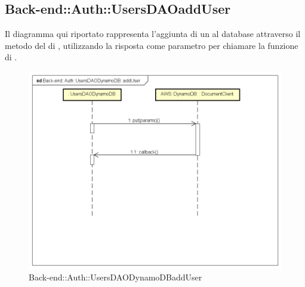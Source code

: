 \subsection{Back-end::Auth::UsersDAOaddUser}
Il diagramma qui riportato rappresenta l'aggiunta di un  al database attraverso il metodo  del  di , utilizzando la risposta come parametro per chiamare la funzione di .
\begin{figure}[h] \centering \includegraphics[width=\textwidth,height=\textheight,keepaspectratio]{images/diagrams/back-end/Ufficial_Backend/Back-endAuthUsersDAODynamoDBaddUser.png} 	\caption{Back-end::Auth::UsersDAODynamoDBaddUser}
\end{figure} 
\newpage
